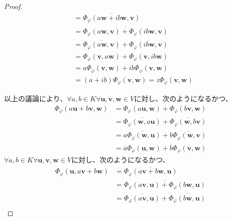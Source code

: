 \documentclass[dvipdfmx]{jsarticle}
\begin{document}
\begin{proof}
\begin{align*}
&= \overline{\varPhi_{\varphi}\left( a\mathbf{w} + ib\mathbf{w},\mathbf{v} \right)}\\
&= \overline{\varPhi_{\varphi}\left( a\mathbf{w},\mathbf{v} \right) + \varPhi_{\varphi}\left( ib\mathbf{w},\mathbf{v} \right)}\\
&= \overline{\varPhi_{\varphi}\left( a\mathbf{w},\mathbf{v} \right)} + \overline{\varPhi_{\varphi}\left( ib\mathbf{w},\mathbf{v} \right)}\\
&= \varPhi_{\varphi}\left( \mathbf{v},a\mathbf{w} \right) + \varPhi_{\varphi}\left( \mathbf{v},ib\mathbf{w} \right)\\
&= a\varPhi_{\varphi}\left( \mathbf{v},\mathbf{w} \right) + ib\varPhi_{\varphi}\left( \mathbf{v},\mathbf{w} \right)\\
&= (a + ib)\varPhi_{\varphi}\left( \mathbf{v},\mathbf{w} \right) = z\varPhi_{\varphi}\left( \mathbf{v},\mathbf{w} \right)
\end{align*}\par
以上の議論により、$\forall a,b \in K\forall\mathbf{u},\mathbf{v},\mathbf{w} \in V$に対し、次のようになるかつ、
\begin{align*}
\varPhi_{\varphi}\left( a\mathbf{u} + b\mathbf{v},\mathbf{w} \right) &= \varPhi_{\varphi}\left( a\mathbf{u},\mathbf{w} \right) + \varPhi_{\varphi}\left( b\mathbf{v},\mathbf{w} \right)\\
&= \overline{\varPhi_{\varphi}\left( \mathbf{w},a\mathbf{u} \right)} + \overline{\varPhi_{\varphi}\left( \mathbf{w},b\mathbf{v} \right)}\\
&= \overline{a\varPhi_{\varphi}\left( \mathbf{w},\mathbf{u} \right)} + \overline{b\varPhi_{\varphi}\left( \mathbf{w},\mathbf{v} \right)}\\
&= \overline{a}\varPhi_{\varphi}\left( \mathbf{u},\mathbf{w} \right) + \overline{b}\varPhi_{\varphi}\left( \mathbf{v},\mathbf{w} \right)
\end{align*}
$\forall a,b \in K\forall\mathbf{u},\mathbf{v},\mathbf{w} \in V$に対し、次のようになるかつ、
\begin{align*}
\varPhi_{\varphi}\left( \mathbf{u},a\mathbf{v} + b\mathbf{w} \right) &= \overline{\varPhi_{\varphi}\left( a\mathbf{v} + b\mathbf{w},\mathbf{u} \right)}\\
&= \overline{\varPhi_{\varphi}\left( a\mathbf{v},\mathbf{u} \right) + \varPhi_{\varphi}\left( b\mathbf{w},\mathbf{u} \right)}\\
&= \overline{\varPhi_{\varphi}\left( a\mathbf{v},\mathbf{u} \right)} + \overline{\varPhi_{\varphi}\left( b\mathbf{w},\mathbf{u} \right)}\\

\end{align*}
\end{proof}
\end{document}
